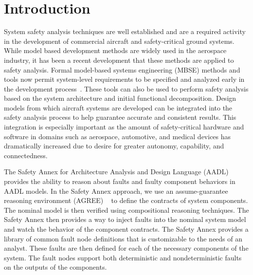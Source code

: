 \section{Introduction}









System safety analysis techniques are well established and are a required activity in the development of commercial aircraft and safety-critical ground systems. While model based development methods are widely used in the aerospace industry, it has been a recent development that these methods are applied to safety analysis. Formal model-based systems engineering (MBSE) methods and tools now permit system-level requirements to be specified and analyzed early in the development process~\cite{QFCS15:backes,hilt2013,NFM2012:CoGaMiWhLaLu,DBLP:journals/scp/CimattiT15,Pajic2012,DBLP:conf/adaEurope/SokolskyLC09}. These tools can also be used to perform safety analysis based on the system architecture and initial functional decomposition. Design models from which aircraft systems are developed can be integrated into the safety analysis process to help guarantee accurate and consistent results. This integration is especially important as the amount of safety-critical hardware and software in domains such as aerospace, automotive, and medical devices has dramatically increased due to desire for greater autonomy, capability, and connectedness.

The Safety Annex for Architecture Analysis and Design Language (AADL) provides the ability to reason about faults and faulty component behaviors in AADL models. In the Safety Annex approach, we use an assume-guarantee reasoning environment (AGREE) ~\cite{NFM2012:CoGaMiWhLaLu} to define the contracts of system components. The nominal model is then verified using compositional reasoning techniques. The Safety Annex then provides a way to inject faults into the nominal system model and watch the behavior of the component contracts. The Safety Annex provides a library of common fault node definitions that is customizable to the needs of an analyst. These faults are then defined for each of the necessary components of the system. The fault nodes support both deterministic and nondeterministic faults on the outputs of the components. 

